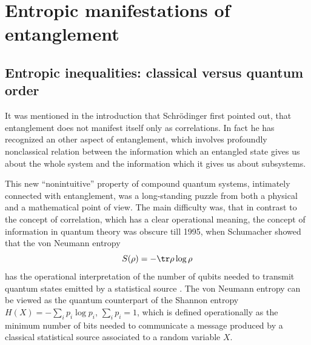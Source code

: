 \documentclass[rmp,12pt,preprint]{revtex4-2}
\begin{document}
\section {Entropic manifestations of entanglement}
\label{sec:entropic}
\subsection { Entropic inequalities: classical versus quantum order}

It was mentioned in the introduction that Schr{\"o}dinger first
pointed out, that entanglement does not manifest itself only as
correlations. In fact he has recognized an other aspect of
entanglement, which involves profoundly nonclassical relation between
the information which an entangled state gives us about the whole
system and the information which it gives us about subsystems.

This new ``nonintuitive'' property of compound quantum systems,
intimately connected with entanglement, was a long-standing puzzle
from both a physical and a mathematical point of view. The main
difficulty was, that in contrast to the concept of correlation, which
has a clear operational meaning, the concept of information in quantum
theory was obscure till 1995, when Schumacher showed that the von
Neumann entropy
\begin{equation}
S(\rho) = - {\tr}\rho \log\rho \label{von}
\end{equation}
has the operational interpretation of the number of qubits needed to
transmit quantum states emitted by a statistical source \cite
{Schumacher1}. The von Neumann entropy can be viewed as the quantum
counterpart of the Shannon entropy $H(X)=-\sum_ip_i\log{p_i}$,
$\sum_ip_i=1$, which is defined operationally as the minimum number of
bits needed to communicate a message produced by a classical
statistical source associated to a random variable $X$.
\end{document}
